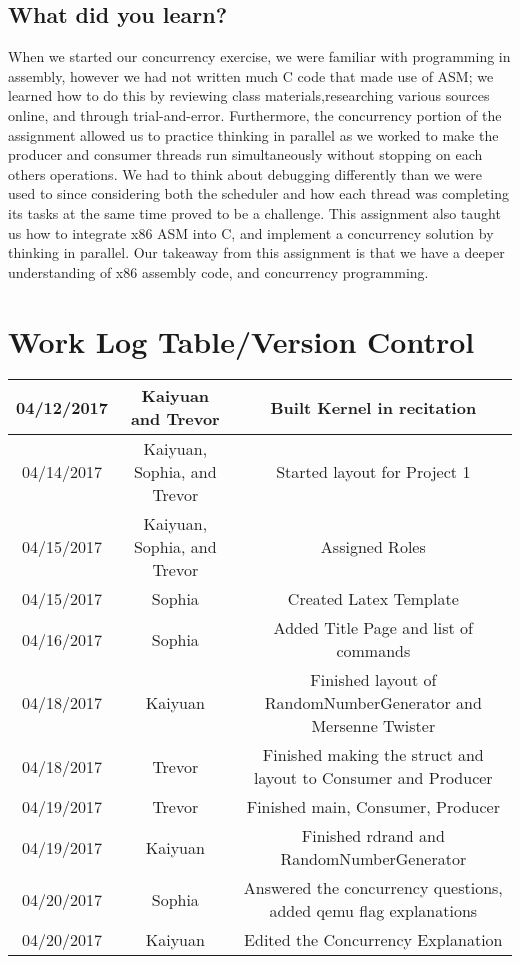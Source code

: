\documentclass[letterpaper,10pt,draftclsnofoot,onecolumn]{IEEEtran}
\begin{document}
\begin{flushleft}
\subsection{ What did you learn?} 
When we started our concurrency exercise, we were familiar with programming in assembly, however we had not written much C code that made use of ASM; we learned how to do this by reviewing class materials,researching various sources online, and through trial-and-error. Furthermore, the concurrency portion of the assignment allowed us to practice thinking in parallel as we worked to make the producer and consumer threads run simultaneously without stopping on each others operations. We had to think about debugging differently than we were used to since considering both the scheduler and how each thread was completing its tasks at the same time proved to be a challenge. This assignment also taught us how to integrate x86 ASM into C, and implement a concurrency
solution by thinking in parallel. Our takeaway from this assignment is that we have a deeper understanding of x86 assembly code, and concurrency programming.

\section{Work Log Table/Version Control}

\begin{center}
	\begin{tabular}{||c c c||}
	\hline \hline
	04/12/2017 & Kaiyuan and Trevor & Built Kernel in recitation \\
	\hline
		04/14/2017 & Kaiyuan, Sophia, and Trevor & Started layout for Project 1 \\
	\hline
		04/15/2017 & Kaiyuan, Sophia, and Trevor & Assigned Roles \\
	\hline
		04/15/2017 & Sophia & Created Latex Template \\
	\hline
		04/16/2017 & Sophia & Added Title Page and list of commands \\
	\hline
		04/18/2017 & Kaiyuan & Finished layout of RandomNumberGenerator and Mersenne Twister \\
	\hline
		04/18/2017 & Trevor & Finished making the struct and layout to Consumer and Producer \\
	\hline
		04/19/2017 & Trevor & Finished main, Consumer, Producer \\
	\hline
		04/19/2017 & Kaiyuan & Finished rdrand and RandomNumberGenerator \\
	\hline
04/20/2017 & Sophia & Answered the concurrency questions, added qemu flag explanations \\
	\hline
		04/20/2017 & Kaiyuan & Edited the Concurrency Explanation\\
	\hline

\end{tabular}
\end{center}
\clearpage
\end{flushleft}
\end{document}
